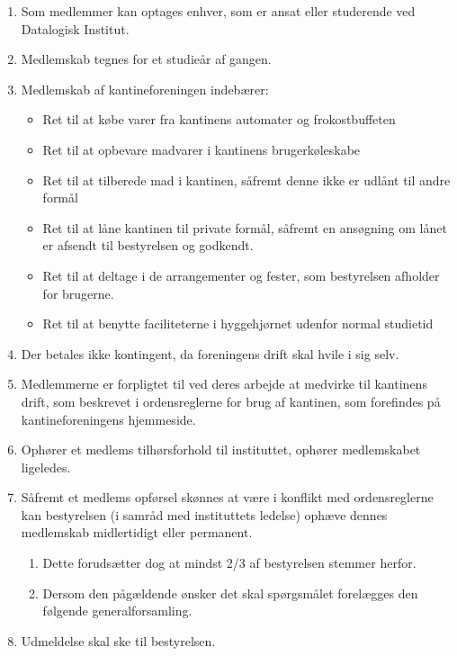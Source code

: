 \documentclass[a4paper, 10pt]{article}
\renewcommand\thesection{\textsection\arabic{section}}
\newenvironment{stykenum}{
  \begin{enumerate}[%
    label=Stk.~\arabic*., ref=\textsection~\theenumi~Stk.~\arabic*, start=1]
}{\end{enumerate}}
\newenvironment{substykenum}{
  \begin{enumerate}[%
          label=Stk.~\arabic{enumi}.\arabic*:,
      ref=\thesection~Stk.~\arabic{enumi}.\arabic*, start=1]
}{\end{enumerate}}
\begin{document}
\begin{stykenum}
\item \label{medlemmer} Som medlemmer kan optages enhver, som er ansat eller
studerende ved Datalogisk Institut.
    \item Medlemskab tegnes for et studieår
af gangen.
    \item Medlemskab af kantineforeningen indebærer:

\medskip

\begin{itemize}

\item Ret til at købe varer fra kantinens automater og frokostbuffeten

\item Ret til at opbevare madvarer i kantinens brugerkøleskabe

\item Ret til at tilberede mad i kantinen, såfremt denne ikke er
udlånt til andre formål

\item Ret til at låne kantinen til private formål, såfremt en
ansøgning om lånet er afsendt til bestyrelsen og godkendt.

\item Ret til at deltage i de arrangementer og fester, som bestyrelsen
afholder for brugerne.

\item Ret til at benytte faciliteterne i hyggehjørnet udenfor normal
studietid

\end{itemize}

\item Der betales ikke kontingent, da foreningens drift skal hvile i sig
selv.

\item Med\-lemmerne er forpligtet til ved deres arbejde at medvirke
til kantinens drift, som beskrevet i ordensreglerne for brug af
kantinen, som forefindes på kantineforeningens hjemmeside.
\item Ophører et
medlems tilhørsforhold til instituttet, ophører medlemskabet
ligeledes.
\item Såfremt et medlems opførsel skønnes at være i konflikt med
ordensreglerne kan bestyrelsen (i samråd med instituttets le\-delse)
ophæve dennes medlemskab midlertidigt eller permanent.
    \begin{substykenum}
    \item Dette
    forudsætter dog at mindst 2/3 af bestyrelsen stemmer herfor.
    \item Dersom
    den pågældende ønsker det skal spørgsmålet forelægges den følgende
    generalforsamling.
    \end{substykenum}
    \item Udmeldelse skal ske til bestyrelsen.
\end{stykenum}
\end{document}
